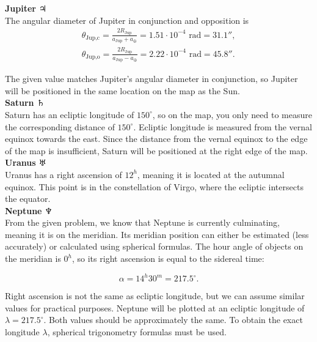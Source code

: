\documentclass[a4paper,12pt]{extarticle}
\begin{document}
\begin{sol}
\textbf{Jupiter} $\Jupiter$ \\

The angular diameter of Jupiter in conjunction and opposition is
\begin{gather*}
	\theta_{\text{Jup,c}} = \frac{2R_{\text{Jup}}}{a_{\text{Jup}} + a_{\oplus}} = 1.51 \cdot 10^{-4} \text{ rad} = 31.1'',\\
	\theta_{\text{Jup,o}} = \frac{2R_{\text{Jup}}}{a_{\text{Jup}} - a_{\oplus}} = 2.22 \cdot 10^{-4} \text{ rad} = 45.8''.
\end{gather*}


The given value matches Jupiter's angular diameter in conjunction, so Jupiter will be positioned in the same location on the map as the Sun.\\

\textbf{Saturn} $\Saturn$ \\

Saturn has an ecliptic longitude of \(150^\circ\), so on the map, you only need to measure the corresponding distance of \(150^\circ\). Ecliptic longitude is measured from the vernal equinox towards the east. Since the distance from the vernal equinox to the edge of the map is insufficient, Saturn will be positioned at the right edge of the map.\\

\textbf{Uranus} $\Uranus$ \\

Uranus has a right ascension of \(12^h\), meaning it is located at the autumnal equinox. This point is in the constellation of Virgo, where the ecliptic intersects the equator.\\

\textbf{Neptune} $\Neptune$\\

From the given problem, we know that Neptune is currently culminating, meaning it is on the meridian. Its meridian position can either be estimated (less accurately) or calculated using spherical formulas. The hour angle of objects on the meridian is \(0^h\), so its right ascension is equal to the sidereal time:

\[
\alpha = 14^h 30^m = 217.5^\circ.
\]

Right ascension is not the same as ecliptic longitude, but we can assume similar values for practical purposes. Neptune will be plotted at an ecliptic longitude of \(\lambda = 217.5^\circ\). Both values should be approximately the same. To obtain the exact longitude \(\lambda\), spherical trigonometry formulas must be used.


\end{sol}
\end{document}
